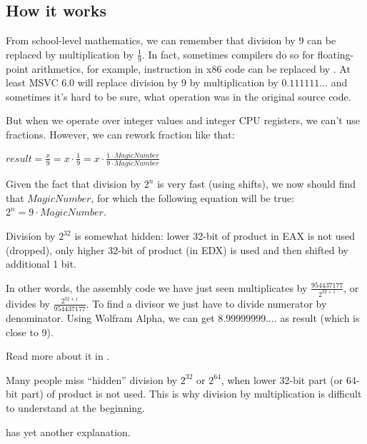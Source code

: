 ﻿\subsection{How it works}

From school-level mathematics, we can remember that division by 9 can be replaced by multiplication by $\frac{1}{9}$.
In fact, sometimes compilers do so for floating-point arithmetics, for example,  instruction in x86 code
can be replaced by .
At least MSVC 6.0 will replace division by 9 by multiplication by $0.111111...$ and sometimes it's hard to be sure,
what operation was in the original source code.

But when we operate over integer values and integer CPU registers, we can't use fractions.
However, we can rework fraction like that:

\begin{center}
$result = \frac{x}{9} = x \cdot \frac{1}{9} = x \cdot \frac{1 \cdot MagicNumber}{9 \cdot MagicNumber}$
\end{center}

Given the fact that division by $2^n$ is very fast (using shifts), we now should find that $MagicNumber$,
for which the following
equation will be true: $2^n = 9 \cdot MagicNumber$.

Division by $2^{32}$ is somewhat hidden: lower 32-bit of product in EAX is not used (dropped), only higher 32-bit of
product (in EDX) is used and then shifted by additional 1 bit.

In other words, the assembly code we have just seen multiplicates by {\Large $\frac{954437177}{2^{32+1}}$},
or divides by {\Large $\frac{2^{32+1}}{954437177}$}.
To find a divisor we just have to divide numerator by denominator.
Using Wolfram Alpha, we can get 8.99999999.... as result (which is close to 9).


Read more about it in .

Many people miss ``hidden'' division by $2^{32}$ or $2^{64}$,
when lower 32-bit part (or 64-bit part) of product is not used.
This is why division by multiplication is difficult to understand at the beginning.

\MathForProg has yet another explanation.

